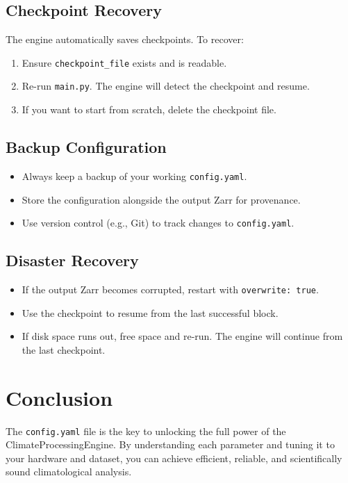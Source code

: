 \documentclass[12pt,a4paper]{article}
\begin{document}
\subsection{Checkpoint Recovery}
The engine automatically saves checkpoints. To recover:
\begin{enumerate}
    \item Ensure \texttt{checkpoint\_file} exists and is readable.
    \item Re-run \texttt{main.py}. The engine will detect the checkpoint and resume.
    \item If you want to start from scratch, delete the checkpoint file.
\end{enumerate}

\subsection{Backup Configuration}
\begin{itemize}
    \item Always keep a backup of your working \texttt{config.yaml}.
    \item Store the configuration alongside the output Zarr for provenance.
    \item Use version control (e.g., Git) to track changes to \texttt{config.yaml}.
\end{itemize}

\subsection{Disaster Recovery}
\begin{itemize}
    \item If the output Zarr becomes corrupted, restart with \texttt{overwrite: true}.
    \item Use the checkpoint to resume from the last successful block.
    \item If disk space runs out, free space and re-run. The engine will continue from the last checkpoint.
\end{itemize}

\section{Conclusion}

The \texttt{config.yaml} file is the key to unlocking the full power of the ClimateProcessingEngine. By understanding each parameter and tuning it to your hardware and dataset, you can achieve efficient, reliable, and scientifically sound climatological analysis.
\end{document}
